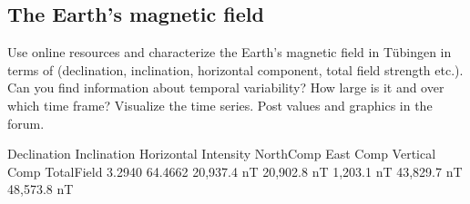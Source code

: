 \subsection{The Earth's magnetic field}
Use online resources and characterize the Earth's magnetic field in Tübingen in terms of (declination, inclination, horizontal component, total field strength etc.). Can you find information about temporal variability? How large is it and over which time frame? Visualize the time series. Post values and graphics in the forum.

\ifanswers
    \begin{tcolorbox}[enhanced jigsaw,breakable,pad at break*=1mm,
    colback=blue!5!white,colframe=babyblueeyes,title=Solutions]
            \begin{center}
            \end{center}
        Declination Inclination Horizontal Intensity NorthComp East Comp Vertical Comp TotalField
        3.2940 	64.4662 	20,937.4 nT 	20,902.8 nT 1,203.1 nT 	43,829.7 nT 	48,573.8 nT
    \end{tcolorbox}
    \fi